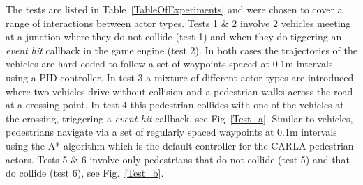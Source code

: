 \documentclass[letterpaper, 10 pt, journal, twoside]{IEEEtran}
\begin{document}
The tests are listed in Table~\ref{TableOfExperiments} and were chosen to cover a range of interactions between actor types. 
%
Tests 1 \& 2 involve 2 vehicles meeting at a junction where they do not collide (test 1) and when they do tiggering an \textit{event hit} callback in the game engine (test 2). In both cases the trajectories of the vehicles are hard-coded to follow a set of waypoints spaced at $0.1$m 
intervals using a PID controller. In test 3 a mixture of different actor types are introduced where two vehicles drive without collision and a pedestrian walks across the road at a crossing point. In test 4 this pedestrian collides with one of the vehicles at the crossing, triggering a \textit{event hit} callback, see Fig~\ref{Test_a}. Similar to vehicles, pedestrians navigate via a set of regularly spaced waypoints at $0.1$m intervals using the A* algorithm which is the default controller for the CARLA pedestrian actors. Tests 5 \& 6 involve only pedestrians that do not collide (test 5) and that do collide (test 6), see Fig.~\ref{Test_b}. 


\end{document}
